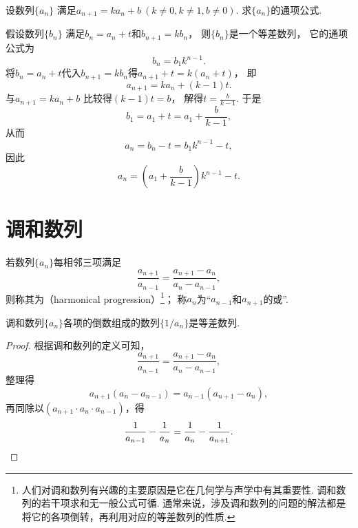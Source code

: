 \begin{example}
设数列\(\{a_n\}\)
满足\(a_{n+1} = k a_n + b\ (k\neq0,k\neq1,b\neq0)\).
求\(\{a_n\}\)的通项公式.
\begin{solution}
假设数列\(\{b_n\}\)
满足\(b_n = a_n + t\)和\(b_{n+1} = k b_n\)，
则\(\{b_n\}\)是一个等差数列，
它的通项公式为\begin{equation*}
	b_n = b_1 k^{n-1}.
\end{equation*}
将\(b_n = a_n + t\)代入\(b_{n+1} = k b_n\)得\(
	a_{n+1} + t
	= k (a_n + t)
\)，
即\begin{equation*}
	a_{n+1}
	= k a_n + (k-1) t.
\end{equation*}
与\(a_{n+1} = k a_n + b\)
比较得\((k-1) t = b\)，
解得\(t = \frac{b}{k-1}\).
于是\begin{equation*}
	b_1
	= a_1 + t
	= a_1 + \frac{b}{k-1},
\end{equation*}
从而\begin{equation*}
	a_n = b_n - t
	= b_1 k^{n-1} - t,
\end{equation*}
因此\begin{equation*}
	a_n
	= (a_1 + \frac{b}{k-1}) k^{n-1} - t.
\end{equation*}
\end{solution}
\end{example}

\section{调和数列}
若数列\(\{a_n\}\)每相邻三项满足\begin{equation*}
    \frac{a_{n+1}}{a_{n-1}}
    = \frac{a_{n+1}-a_n}{a_n-a_{n-1}},
\end{equation*}
则称其为（harmonical progression）\footnote{%
人们对调和数列有兴趣的主要原因是它在几何学与声学中有其重要性.
调和数列的若干项求和无一般公式可循.
通常来说，涉及调和数列的问题的解法都是将它的各项倒转，再利用对应的等差数列的性质.
}；
称\(a_n\)为“\(a_{n-1}\)和\(a_{n+1}\)的或”.

\begin{property}\label{theorem:数列.调和数列的性质}
调和数列\(\{a_n\}\)各项的倒数组成的数列\(\{1/a_n\}\)是等差数列.
\begin{proof}
根据调和数列的定义可知，\begin{equation*}
    \frac{a_{n+1}}{a_{n-1}}
    = \frac{a_{n+1}-a_n}{a_n-a_{n-1}},
\end{equation*}整理得\begin{equation*}
    a_{n+1} (a_n - a_{n-1})
    = a_{n-1} (a_{n+1} - a_n),
\end{equation*}再同除以\((a_{n+1} \cdot a_n \cdot a_{n-1})\)，得\begin{equation*}
    \frac{1}{a_{n-1}} - \frac{1}{a_n}
    = \frac{1}{a_n} - \frac{1}{a_{n+1}}.
    \qedhere
\end{equation*}
\end{proof}
\end{property}

